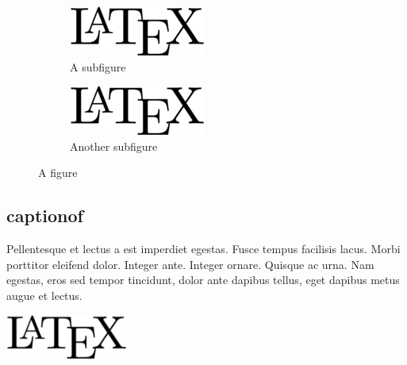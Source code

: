 	\begin{figure}[H]
	\centering
	\begin{subfigure}[b]{.48\linewidth}
		\centering
		\includegraphics[width=0.8\linewidth]{images/latex}
		\caption{A subfigure}\label{fig:2a}
	\end{subfigure}%
	\hfill
	\begin{subfigure}[b]{.48\linewidth}
		\centering
		\includegraphics[width=0.8\linewidth]{images/latex}
		\caption{Another subfigure}\label{fig:2b}
	\end{subfigure}
	\caption{A figure}\label{fig:2}
	\end{figure}

%
\subsection{captionof}

Pellentesque et lectus a est imperdiet egestas. Fusce tempus facilisis lacus. Morbi porttitor eleifend dolor. Integer ante. Integer ornare. Quisque ac urna. Nam egestas, eros sed tempor tincidunt, dolor ante dapibus tellus, eget dapibus metus augue et lectus.

\begin{center}
   \includegraphics[width=0.3\textwidth]{images/latex}
\end{center}

